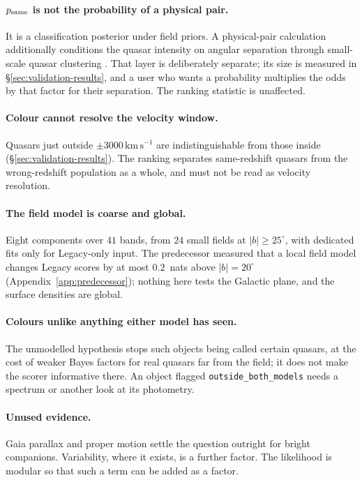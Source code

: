 \documentclass[11pt,a4paper]{article}
\newcommand{\kms}{\,\mathrm{km\,s^{-1}}}
\begin{document}
\paragraph{$p_{\rm same}$ is not the probability of a physical pair.} It is a
classification posterior under field priors. A physical-pair calculation
additionally conditions the quasar intensity on angular separation through
small-scale quasar clustering \citep{hennawi2006,eftekharzadeh2017}. That layer
is deliberately separate; its size is measured in \S\ref{sec:validation-results},
and a user who wants a probability multiplies the odds by that factor for their
separation. The ranking statistic is unaffected.

\paragraph{Colour cannot resolve the velocity window.} Quasars just outside
$\pm3000\kms$ are indistinguishable from those inside (\S\ref{sec:validation-results}).
The ranking separates same-redshift quasars from the wrong-redshift population
as a whole, and must not be read as velocity resolution.

\paragraph{The field model is coarse and global.} Eight components over $41$
bands, from $24$ small fields at $|b|\ge25^\circ$, with dedicated fits only for
Legacy-only input. The predecessor measured that a local field model changes
Legacy scores by at most $0.2$~nats above $|b|=20^\circ$
(Appendix~\ref{app:predecessor}); nothing here tests the Galactic plane, and the
surface densities are global.

\paragraph{Colours unlike anything either model has seen.} The unmodelled
hypothesis stops such objects being called certain quasars, at the cost of
weaker Bayes factors for real quasars far from the field; it does not make the
scorer informative there. An object flagged \texttt{outside\_both\_models} needs
a spectrum or another look at its photometry.

\paragraph{Unused evidence.} Gaia parallax and proper motion settle the question
outright for bright companions. Variability, where it exists, is a further
factor. The likelihood is modular so that such a term can be added as a factor.
\end{document}
